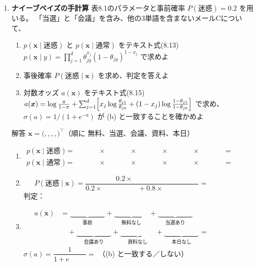 \documentclass[a4paper,dvipdfmx]{jsarticle}
\newcommand{\提出期限}{2026年11月16日（月）}
\newcommand{\学籍番号}{0000000}
\newcommand{\氏名}{氏名を書く}
\newcommand{\提出日}{2026年11月16日}
\newenvironment{answer}{\begin{itembox}[l]{解答}}{\end{itembox}}
\begin{document}
\begin{enumerate}
  \item \textbf{ナイーブベイズの手計算}\quad
    表8.1のパラメータと事前確率 $P(\text{迷惑}) = 0.2$ を用いる。
    「当選」と「会議」を含み、他の3単語を含まないメールCについて、
    \begin{enumerate}
      \item $p(\bm{x} \mid \text{迷惑})$ と $p(\bm{x} \mid \text{通常})$ をテキスト式(8.13)
        $p(\bm{x} \mid y) = \prod_{j=1}^d \theta_{jy}^{x_j}(1 - \theta_{jy})^{1 - x_j}$ で求めよ
      \item 事後確率 $P(\text{迷惑} \mid \bm{x})$ を求め、判定を答えよ
      \item 対数オッズ $a(\bm{x})$ をテキスト式(8.15)
        $a(\bm{x}) = \log\frac{\pi}{1 - \pi} + \sum_{j=1}^d \Bigl[ x_j \log\frac{\theta_{j1}}{\theta_{j0}} + (1 - x_j)\log\frac{1 - \theta_{j1}}{1 - \theta_{j0}} \Bigr]$
        で求め、$\sigma(a) = 1/(1 + e^{-a})$ が (b) と一致することを確かめよ
    \end{enumerate}
    \begin{answer}
      $\bm{x} = ($\phantom{X}$, $\phantom{X}$, $\phantom{X}$, $\phantom{X}$, $\phantom{X}$)^\top$（順に 無料、当選、会議、資料、本日）
      \begin{enumerate}
        \item
          \begin{align*}
            p(\bm{x} \mid \text{迷惑}) &= \phantom{XXXX} \times \phantom{XXXX} \times \phantom{XXXX} \times \phantom{XXXX} \times \phantom{XXXX} = \phantom{XXXXXX} \\
            p(\bm{x} \mid \text{通常}) &= \phantom{XXXX} \times \phantom{XXXX} \times \phantom{XXXX} \times \phantom{XXXX} \times \phantom{XXXX} = \phantom{XXXXXX}
          \end{align*}
        \item
          \begin{equation*}
            P(\text{迷惑} \mid \bm{x}) = \frac{0.2 \times \phantom{XXXXXX}}{0.2 \times \phantom{XXXXXX} + 0.8 \times \phantom{XXXXXX}} = \phantom{XXXXXX}
          \end{equation*}
          判定：\phantom{XXXXXX}
          \vspace{2mm}
        \item
          \begin{align*}
            a(\bm{x}) &= \underbrace{\phantom{XXXXXX}}_{\text{事前}} + \underbrace{\phantom{XXXXXX}}_{\text{無料なし}} + \underbrace{\phantom{XXXXXX}}_{\text{当選あり}} \\
            &\quad + \underbrace{\phantom{XXXXXX}}_{\text{会議あり}} + \underbrace{\phantom{XXXXXX}}_{\text{資料なし}} + \underbrace{\phantom{XXXXXX}}_{\text{本日なし}} = \phantom{XXXXXX}
          \end{align*}
          $\sigma(a) = \dfrac{1}{1 + e^{\phantom{XXXX}}} = $ \phantom{XXXXXX}（(b) と一致する／しない）
          \vspace{2mm}
      \end{enumerate}
    \end{answer}


\end{enumerate}
\end{document}
